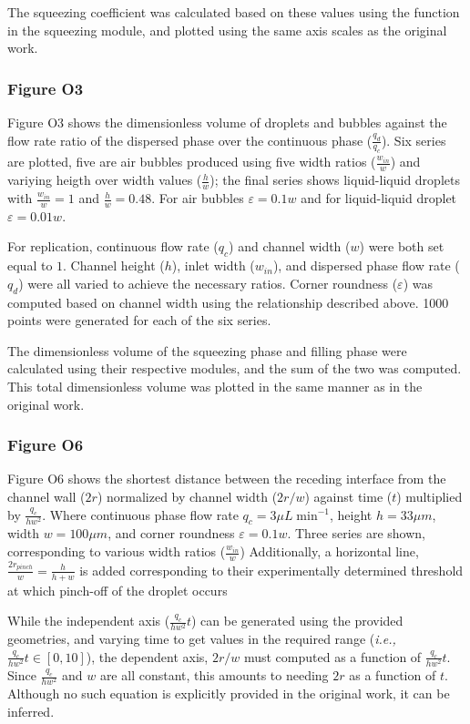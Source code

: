 The squeezing coefficient was calculated based on these values using the function in the
squeezing module, and plotted using the same axis scales as the original work.

\subsubsection{Figure O3}

Figure O3 shows the dimensionless volume of droplets and bubbles against the flow rate ratio
of the dispersed phase over the continuous phase ($\frac{q_d}{q_c}$). Six series are plotted,
five are air bubbles produced using five width ratios ($\frac{w_{in}}{w}$) and variying heigth over width
values ($\frac{h}{w}$); the final series shows liquid-liquid droplets with $\frac{w_{in}}{w} = 1$ and
$\frac{h}{w}=0.48$. For air bubbles $\varepsilon=0.1w$ and for liquid-liquid droplet $\varepsilon=0.01w$.

For replication, continuous flow rate ($q_c$) and channel width ($w$) were both set equal to $1$.
Channel height ($h$), inlet width ($w_{in}$), and dispersed phase flow rate ($q_d$) were all varied to
achieve the necessary ratios. Corner roundness ($\varepsilon$) was computed based on channel width using the
relationship described above. 1000 points were generated for each of the six series.

The dimensionless volume of the squeezing phase and filling phase were calculated using their
respective modules, and the sum of the two was computed. This total dimensionless volume was plotted
in the same manner as in the original work.

\subsubsection{Figure O6}

Figure O6 shows the shortest distance between the receding interface from the channel wall ($2r$) normalized
by channel width ($2r/w$) against time ($t$) multiplied by $\frac{q_c}{hw^2}$. Where continuous phase
flow rate $q_c = 3{\mu}L\;\mathrm{min}^{-1}$, height $h=33{\mu}m$, width $w=100{\mu}m$, and corner roundness
$\varepsilon=0.1w$. Three series are shown, corresponding to various width ratios ($\frac{w_{in}}{w}$)
Additionally, a horizontal line, $\frac{2r_{pinch}}{w}=\frac{h}{h+w}$ is added corresponding to
their experimentally determined threshold at which pinch-off of the droplet occurs

While the independent axis ($\frac{q_c}{hw^2}t$) can be generated using the provided geometries, and varying
time to get values in the required range (\emph{i.e.,} $\frac{q_c}{hw^2}t \in [0,10]$), the dependent axis,
$2r/w$ must computed as a function of $\frac{q_c}{hw^2}t$. Since $\frac{q_c}{hw^2}$ and $w$ are all constant,
this amounts to needing $2r$ as a function of $t$. Although no such equation
is explicitly provided in the original work, it can be inferred.

